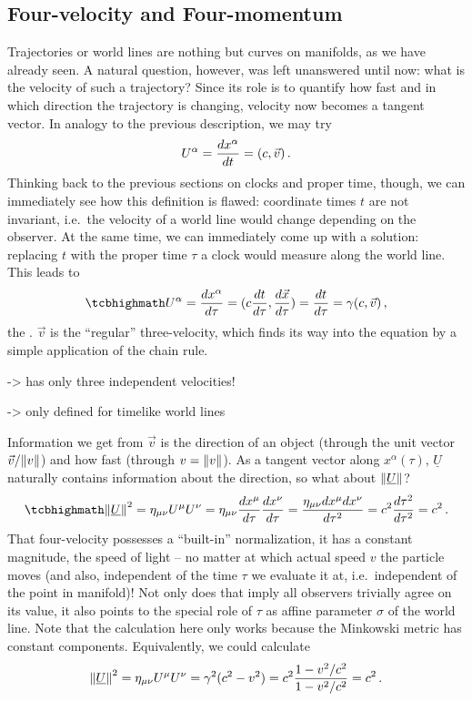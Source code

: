 		\subsection{Four-velocity and Four-momentum}
Trajectories or world lines are nothing but curves on manifolds, as we have already seen. A natural question, however, was left unanswered until now: what is the velocity of such a trajectory? Since its role is to quantify how fast and in which direction the trajectory is changing, velocity now becomes a tangent vector. In analogy to the previous description, we may try
\begin{equation}
U^\alpha = \dv{x^\alpha}{t} = (c, \vec{v}) \, .
\end{equation}
Thinking back to the previous sections on clocks and proper time, though, we can immediately see how this definition is flawed: coordinate times $t$ are not invariant, i.e.~the velocity of a world line would change depending on the observer. At the same time, we can immediately come up with a solution: replacing $t$ with the proper time $\tau$ a clock would measure along the world line. This leads to
\begin{equation}\label{eq:four_velocity}
\eqbox{
U^\alpha = \dv{x^\alpha}{\tau} = (c \dv{t}{\tau}, \dv{\vec{x}}{\tau}) = \dv{t}{\tau} (c, \dv{\vec{x}}{t}) = \gamma (c, \vec{v})
} \, ,
\end{equation}
the . $\vec{v}$ is the \enquote{regular} three-velocity, which finds its way into the equation by a simple application of the chain rule.

-> has only three independent velocities!

-> only defined for timelike world lines


Information we get from $\vec{v}$ is the direction of an object (through the unit vector $\vec{v} / \norm{v}$) and how fast (through $v = \norm{v}$). As a tangent vector along $x^\alpha(\tau)$, $\underline{U}$ naturally contains information about the direction, so what about $\norm{\underline{U}}$?
\begin{equation}
\eqbox{
\norm{\underline{U}}^2 = \eta_{\mu \nu} U^\mu U^\nu = \eta_{\mu \nu} \dv{x^\mu}{\tau} \dv{x^\nu}{\tau} = \frac{\eta_{\mu \nu} dx^\mu dx^\nu}{d\tau^2} = c^2 \frac{d\tau^2}{d\tau^2} = c^2
} \, .
\end{equation}
That four-velocity possesses a \enquote{built-in} normalization, it has a constant magnitude, the speed of light -- no matter at which actual speed $v$ the particle moves (and also, independent of the time $\tau$ we evaluate it at, i.e.~independent of the point in manifold)! Not only does that imply all observers trivially agree on its value, it also points to the special role of $\tau$ as affine parameter $\sigma$ of the world line. Note that the calculation here only works because the Minkowski metric has constant components. Equivalently, we could calculate
\begin{equation*}
\norm{\underline{U}}^2 = \eta_{\mu \nu} U^\mu U^\nu = \gamma^2 (c^2 - v^2) = c^2 \frac{1 - v^2 / c^2}{1 - v^2 / c^2} = c^2 \, .
\end{equation*}






